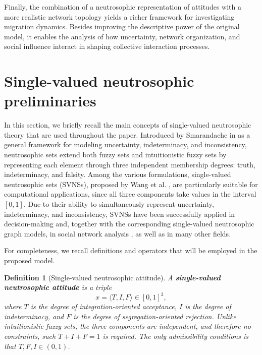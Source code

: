 \documentclass[11pt,a4paper]{article}
\newtheorem{definition}[theorem]{Definition}
\newcommand{\nstriple}[1]{\langle #1 \rangle}
\begin{document}
	Finally, the combination of a neutrosophic representation of attitudes with a more realistic network topology yields a richer framework for investigating migration dynamics. Besides improving the descriptive power of the original model, it enables the analysis of how uncertainty, network organization, and social influence interact in shaping collective interaction processes.

	\section{Single-valued neutrosophic preliminaries}
	In this section, we briefly recall the main concepts of single-valued neutrosophic theory that are used throughout the paper. Introduced by Smarandache in \cite{smarandache1999} as a general framework for modeling uncertainty, indeterminacy, and inconsistency, neutrosophic sets extend both fuzzy sets and intuitionistic fuzzy sets by representing each element through three independent membership degrees: truth, indeterminacy, and falsity.
	Among the various formulations, single-valued neutrosophic sets (SVNSs), proposed by Wang et al. \cite{wang2010svns}, are particularly suitable for computational applications, since all three components take values in the interval $[0,1]$. 
	Due to their ability to simultaneously represent uncertainty, indeterminacy, and inconsistency, SVNSs have been successfully applied	in decision-making \cite{ye2014crossentropy,sodenkamp2018} and, together with the corresponding single-valued neutrosophic graph models, in social network analysis \cite{mahapatra2020,peng2022}, as well as in many other fields.
	
	For completeness, we recall definitions and operators that will be employed in the proposed model.
	
	\begin{definition}[Single-valued neutrosophic attitude]
		A \textbf{single-valued neutrosophic attitude} is a triple
		$$
		x = \nstriple{T,I,F}\in[0,1]^3,
		$$
		where $T$ is the degree of integration-oriented acceptance, $I$ is the degree of indeterminacy, and $F$ is the degree of segregation-oriented rejection. Unlike intuitionistic fuzzy sets, the three components are independent, and therefore no constraints, such $T + I + F = 1$ is required. The only admissibility conditions is that $T,F,I \in (0,1)$.
	\end{definition}
	
\end{document}
